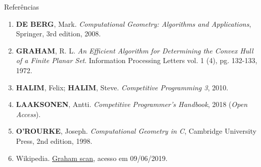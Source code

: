 \begin{frame}[fragile]{Referências}

    \begin{enumerate}

        \item \textbf{DE BERG}, Mark. \textit{Computational Geometry: Algorithms and Applications}, Springer, 3rd edition, 2008.

        \item \textbf{GRAHAM}, R. L. \textit{An Efficient Algorithm for Determining the Convex
           Hull of a Finite Planar Set}. Information Processing Letters vol. 1 (4), pg. 132-133,
            1972.

        \item \textbf{HALIM}, Felix; \textbf{HALIM}, Steve. \textit{Competitive Programming 3}, 2010.
        \item \textbf{LAAKSONEN}, Antti. \textit{Competitive Programmer's Handbook}, 2018 (\textit{Open Access}).

        \item \textbf{O'ROURKE}, Joseph. \textit{Computational Geometry in C}, Cambridge University Press, 2nd edition, 1998. 

        \item Wikipedia. \href{https://en.wikipedia.org/wiki/Graham\_scan}{Graham scan}, acesso em
            09/06/2019.
    \end{enumerate}

\end{frame}
